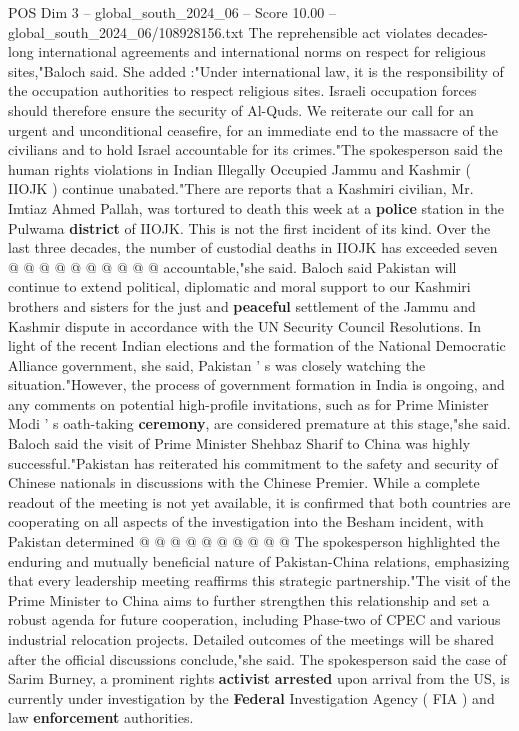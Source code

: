\begin{textsample}{POS Dim 3 – global\_south\_2024\_06 – Score 10.00 – global\_south\_2024\_06/108928156.txt}
The reprehensible act violates decades-long international agreements and international norms on respect for religious sites,"Baloch said.
She added :"Under international law, it is the responsibility of the occupation authorities to respect religious sites.
Israeli occupation forces should therefore ensure the security of Al-Quds.
We reiterate our call for an urgent and unconditional ceasefire, for an immediate end to the massacre of the civilians and to hold Israel accountable for its crimes."The spokesperson said the human rights violations in Indian Illegally Occupied Jammu and Kashmir ( IIOJK ) continue unabated."There are reports that a Kashmiri civilian, Mr.
Imtiaz Ahmed Pallah, was tortured to death this week at a \textbf{police} station in the Pulwama \textbf{district} of IIOJK.
This is not the first incident of its kind.
Over the last three decades, the number of custodial deaths in IIOJK has exceeded seven @ @ @ @ @ @ @ @ @ @ accountable,"she said.
Baloch said Pakistan will continue to extend political, diplomatic and moral support to our Kashmiri brothers and sisters for the just and \textbf{peaceful} settlement of the Jammu and Kashmir dispute in accordance with the UN Security Council Resolutions.
In light of the recent Indian elections and the formation of the National Democratic Alliance government, she said, Pakistan ' s was closely watching the situation."However, the process of government formation in India is ongoing, and any comments on potential high-profile invitations, such as for Prime Minister Modi ' s oath-taking \textbf{ceremony}, are considered premature at this stage,"she said.
Baloch said the visit of Prime Minister Shehbaz Sharif to China was highly successful."Pakistan has reiterated his commitment to the safety and security of Chinese nationals in discussions with the Chinese Premier.
While a complete readout of the meeting is not yet available, it is confirmed that both countries are cooperating on all aspects of the investigation into the Besham incident, with Pakistan determined @ @ @ @ @ @ @ @ @ @ The spokesperson highlighted the enduring and mutually beneficial nature of Pakistan-China relations, emphasizing that every leadership meeting reaffirms this strategic partnership."The visit of the Prime Minister to China aims to further strengthen this relationship and set a robust agenda for future cooperation, including Phase-two of CPEC and various industrial relocation projects.
Detailed outcomes of the meetings will be shared after the official discussions conclude,"she said.
The spokesperson said the case of Sarim Burney, a prominent rights \textbf{activist} \textbf{arrested} upon arrival from the US, is currently under investigation by the \textbf{Federal} Investigation Agency ( FIA ) and law \textbf{enforcement} authorities.

\end{textsample}
